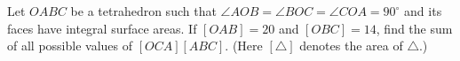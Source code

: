 Let $OABC$ be a tetrahedron such that $\angle AOB = \angle BOC = \angle COA = 90^\circ$ and its faces have integral surface areas. If $[OAB] = 20$ and $[OBC] = 14$, find the sum of all possible values of $[OCA][ABC]$.
(Here $[\triangle]$ denotes the area of $\triangle$.)
